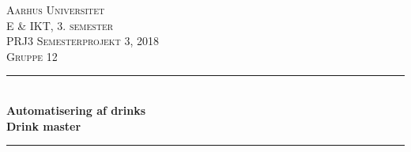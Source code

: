 

\usepackage[utf8]{inputenc}
\usepackage[table,xcdraw]{xcolor}
\usepackage{float}
\usepackage{graphicx}
\usepackage{placeins}
\TabPositions{4cm, 6cm, 8cm}



\newcommand{\HRule}{\rule{\linewidth}{0.5mm}} %

\center %
 

\textsc{\LARGE Aarhus Universitet}\\[1cm] %
\textsc{\Large E \& IKT, 3. semester}\\[0.5cm] %
\textsc{\large PRJ3 Semesterprojekt 3, 2018}\\[0.5cm] %
\textsc{\large Gruppe 12}\\[0.5cm] %


\HRule \\[0.5cm]
{ \huge \bfseries Automatisering af drinks}\\[0.5cm] %
{ \textbf{\Large Drink master}} %
\HRule \\[1cm]

\vfill %

\frontmatter
\tableofcontents*
\mainmatter









